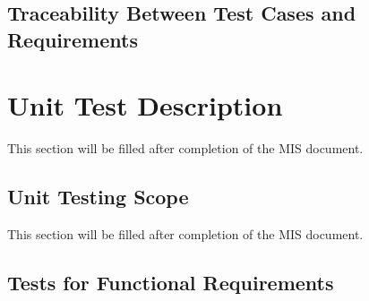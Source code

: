 \documentclass[12pt, titlepage]{article}
\begin{document}
\subsection{Traceability Between Test Cases and Requirements}


\newpage

\section{Unit Test Description}

This section will be filled after completion of the MIS document.



\subsection{Unit Testing Scope}

This section will be filled after completion of the MIS document.


\subsection{Tests for Functional Requirements}
\end{document}
